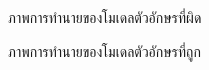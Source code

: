 \documentclass[12pt,oneside,openright,a4paper]{cpe-thai-project}
\begin{document}
   \newpage
   \begin{figure}[!h]\centering
    \setlength{\fboxrule}{0.2mm} %
    \setlength{\fboxsep}{1cm}
    \caption{ภาพการทำนายของโมเดลตัวอักษรที่ผิด}\label{fig:system}                  
   \end{figure}
   \begin{figure}[!h]\centering
    \setlength{\fboxrule}{0.2mm} %
    \setlength{\fboxsep}{1cm}
    \caption{ภาพการทำนายของโมเดลตัวอักษรที่ถูก}\label{fig:system}                  
   \end{figure}
   \newpage
\end{document}
